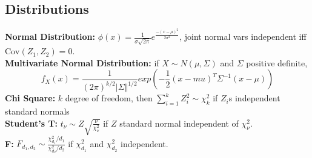 \documentclass[10pt]{article}
\newcommand{\cov}{\mathrm{Cov}}
\theoremstyle{definition}
\begin{document}
\begin{multicols}{2}
\subsection{Distributions} 
{\bf Normal Distribution:} \(\phi(x) = \frac{1}{\sigma\sqrt{2\pi}}e^{\frac{-(x-\mu)^2}{2\sigma^2}}\), joint normal vars independent iff \(\cov(Z_1,Z_2)=0\). \\
{\bf Multivariate Normal Distribution:} if \(X \sim N(\mu,\Sigma)\) and $\Sigma$ positive definite,
\[f_X(x) = \frac{1}{(2\pi)^{k/2}\vert\Sigma\Vert^{1/2}}exp\left(-\frac{1}{2}(x-mu)^T\Sigma^{-1}(x-\mu)\right) \]
{\bf Chi Square:} $k$ degree of freedom, then \(\sum_{i=1}^k Z_i^2 \sim \chi^2_k\) if $Z_i$s independent standard normals \\
{\bf Student's T:} \(t_\nu \sim Z\sqrt{\frac{\nu}{\chi_\nu^2}}\) if $Z$ standard normal independent of $\chi_\nu^2$. \\
{\bf F:} \(F_{d_1,d_2} \sim \frac{\chi_{d_1}^2/d_1}{\chi_{d_2}^2/d_2}\) if \(\chi_{d_1}^2\) and \(\chi_{d_2}^2\) independent.


\end{multicols}
\end{document}
